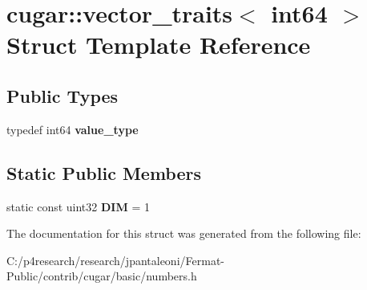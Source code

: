 \hypertarget{structcugar_1_1vector__traits_3_01int64_01_4}{}\section{cugar\+:\+:vector\+\_\+traits$<$ int64 $>$ Struct Template Reference}
\label{structcugar_1_1vector__traits_3_01int64_01_4}
\subsection*{Public Types}
\begin{DoxyCompactItemize}
\item 
\mbox{\label{structcugar_1_1vector__traits_3_01int64_01_4_a2f1f141703f4617b7cc8ab3f42c0900b}} 
typedef int64 {\bfseries value\+\_\+type}
\end{DoxyCompactItemize}
\subsection*{Static Public Members}
\begin{DoxyCompactItemize}
\item 
\mbox{\label{structcugar_1_1vector__traits_3_01int64_01_4_ae976d18bbbcfda6b4b8b45fa50d5f96e}} 
static const uint32 {\bfseries D\+IM} = 1
\end{DoxyCompactItemize}


The documentation for this struct was generated from the following file\+:\begin{DoxyCompactItemize}
\item 
C\+:/p4research/research/jpantaleoni/\+Fermat-\/\+Public/contrib/cugar/basic/numbers.\+h\end{DoxyCompactItemize}
